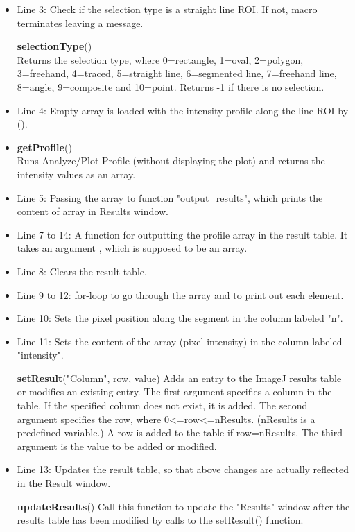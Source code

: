 \begin{itemize}
\item Line 3: Check if the selection type is a straight line ROI. If not, macro terminates leaving a message. 

\begin{indentCom}
\textbf{selectionType}()\\ 
Returns the selection type, where 0=rectangle, 1=oval, 2=polygon, 3=freehand, 4=traced, 5=straight line, 6=segmented line, 7=freehand line, 8=angle, 9=composite and 10=point. Returns -1 if there is no selection.
\end{indentCom}

\item Line 4: Empty array  is loaded with the intensity profile along the line ROI by ().
\item
\begin{indentCom}
\textbf{getProfile}()\\
Runs Analyze/Plot Profile (without displaying the plot) and returns the intensity values as an array.
\end{indentCom}

\item Line 5: Passing the array  to function "output\_results", which prints the content of array in Results window. 

\item Line 7 to 14: A function for outputting the profile array in the result table. It takes an argument , which is supposed to be an array. 
\item Line 8: Clears the result table. 
\item Line 9 to 12: for-loop to go through the array and to print out each element. 
\item Line 10: Sets the pixel position along the segment in the column labeled "n". 
\item Line 11: Sets the content of the array (pixel intensity) in the column labeled "intensity".

\begin{indentCom}
\textbf{setResult}("Column", row, value)
Adds an entry to the ImageJ results table or modifies an existing entry. The first argument specifies a column in the table. If the specified column does not exist, it is added. The second argument specifies the row, where 0<=row<=nResults. (nResults is a predefined variable.) A row is added to the table if row=nResults. The third argument is the value to be added or modified. 
\end{indentCom}
\item Line 13: Updates the result table, so that above changes are actually reflected in the Result window. 

\begin{indentCom}
\textbf{updateResults}()
Call this function to update the "Results" window after the results table has been modified by calls to the setResult() function. 
\end{indentCom}
\end{itemize}

